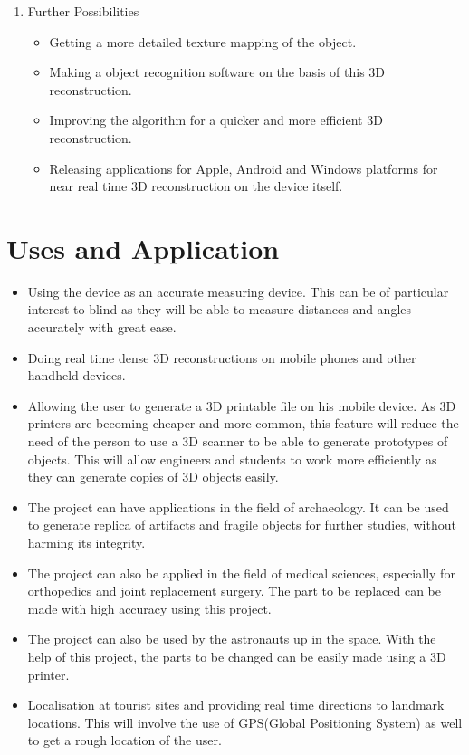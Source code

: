 \documentclass{article}
\begin{document}
\begin{enumerate}
\begin{enumerate}
			\end{enumerate}
			\item Further Possibilities
			\begin{itemize}
			    \item Getting a more detailed texture mapping of the object.
			    \item Making a object recognition software on the basis of this 3D reconstruction.
			    \item Improving the algorithm for a quicker and more efficient 3D reconstruction. 
				\item Releasing applications for Apple, Android and Windows platforms for near real time 3D reconstruction on the device itself.
			\end{itemize}
		\end{enumerate}

	\section{Uses and Application}
			\begin{itemize}
				\item Using the device as an accurate measuring device. This can be of particular interest to blind as they will be able to measure distances and angles accurately with great ease.
				\item Doing real time dense 3D reconstructions on mobile phones and other handheld devices. 
				\item Allowing the user to generate a 3D printable file on his mobile device. As 3D printers are becoming cheaper and more common, this feature will reduce the need of the person to use a 3D scanner to be able to generate prototypes of objects. This will allow engineers and students to work more efficiently as they can generate copies of 3D objects easily.
				\item The project can have applications in the field of archaeology. It can be used to generate replica of artifacts and fragile objects for further studies, without harming its integrity.
				\item The project can also be applied in the field of medical sciences, especially for orthopedics and joint replacement surgery. The part to be replaced can be made with high accuracy using this project.
				\item The project can also be used by the astronauts up in the space. With the help of this project, the parts to be changed can be easily made using a 3D printer.
				\item Localisation at tourist sites and providing real time directions to landmark locations. This will involve the use of GPS(Global Positioning System) as well to get a rough location of the user.
			\end{itemize}
\end{document}
